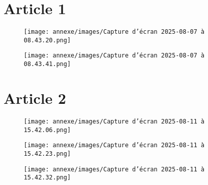 \section{Article 1}
    \label{articlemoto}
    \begin{figure}[H]
        \centering
        \texttt{[image: annexe/images/Capture d’écran 2025-08-07 à 08.43.20.png]} 
    \end{figure}
    \begin{figure}[H]
        \centering
        \texttt{[image: annexe/images/Capture d’écran 2025-08-07 à 08.43.41.png]} 
    \end{figure}

\section{Article 2}
    \label{articlevoiture}

    \begin{figure}[H]
        \centering
        \texttt{[image: annexe/images/Capture d’écran 2025-08-11 à 15.42.06.png]} 
    \end{figure}
    \begin{figure}[H]
        \centering
        \texttt{[image: annexe/images/Capture d’écran 2025-08-11 à 15.42.23.png]} 
    \end{figure}
    \begin{figure}[H]
        \centering
        \texttt{[image: annexe/images/Capture d’écran 2025-08-11 à 15.42.32.png]} 
    \end{figure}